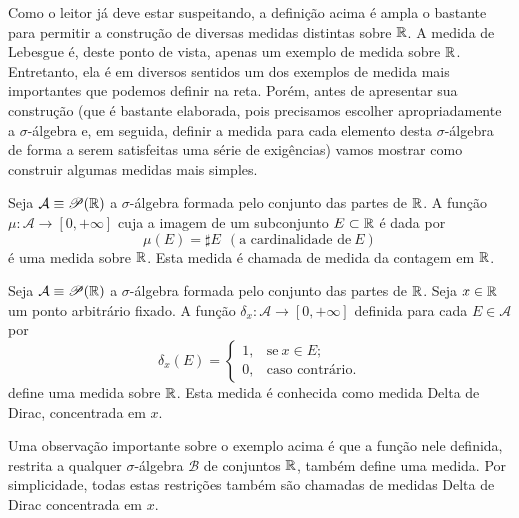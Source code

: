         \medskip 
        
        Como o leitor já deve estar suspeitando, a definição acima é 
        ampla o bastante para permitir a construção de diversas 
        medidas distintas sobre $\mathbb{R}$. A medida de Lebesgue é, deste ponto de vista, 
        apenas um exemplo de medida sobre $\mathbb{R}$. 
        Entretanto, ela é em diversos sentidos um dos exemplos 
        de medida mais importantes que podemos definir na reta. 
        Porém, antes de apresentar sua construção 
        (que é bastante elaborada, pois precisamos escolher apropriadamente a 
        $\sigma$-álgebra e, em seguida, definir a medida para cada 
        elemento desta $\sigma$-álgebra de forma a serem satisfeitas uma série de exigências) 
        vamos mostrar como construir algumas medidas mais simples.
        \begin{exemplo}
            Seja $\mathcal{A} \equiv \mathscr{P}(\mathbb{R})$ a $\sigma$-álgebra 
            formada pelo conjunto das partes de $\mathbb{R}$. 
            A função $\mu:\mathcal{A}\to [0,+\infty]$ cuja a imagem de um subconjunto 
            $E\subset\mathbb{R}$ é dada por 
            \[
                \mu(E)=\sharp E \ \ (\textrm{a cardinalidade de}\ E)
            \]
            é uma medida sobre $\mathbb{R}$. Esta medida é chamada de medida da contagem em $\mathbb{R}$.
        \end{exemplo}
        \begin{exemplo}
        	Seja $\mathcal{A} \equiv \mathscr{P}(\mathbb{R})$ a $\sigma$-álgebra 
        	formada pelo conjunto das partes de $\mathbb{R}$. Seja $x\in\mathbb{R}$ 
        	um ponto arbitrário fixado. 
        	A função $\delta_x:\mathcal{A}\to [0,+\infty]$ 
        	definida para cada $E\in \mathcal{A}$ por
        	\[
            	\delta_{x}(E) = 
            	\begin{cases}
            	    1, & \textrm{se}\ x\in E;
            	    \\
            	    0, & \textrm{caso contrário}.
            	\end{cases}
        	\]
        	define uma medida sobre $\mathbb{R}$. Esta medida é conhecida como 
        	medida Delta de Dirac, concentrada em $x$.
        \end{exemplo}
        Uma observação importante sobre o exemplo acima é que a 
        função nele definida, restrita a qualquer $\sigma$-álgebra $\mathcal{B}$ 
        de conjuntos $\mathbb{R}$, também define uma medida. Por simplicidade, 
        todas estas restrições também são chamadas 
        de medidas Delta de Dirac concentrada em $x$. 
